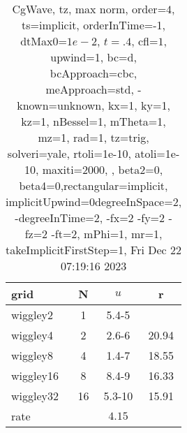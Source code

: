 \begin{table}[H]\tableFont %
\begin{center}
\begin{tabular}{|l|c|c|c|} \hline 
grid  & N &  $ u $ & r \\ \hline 
  wiggley2 &     1 & \num{5.4}{-5} &        \\ \hline
  wiggley4 &     2 & \num{2.6}{-6} & 20.94  \\ \hline
  wiggley8 &     4 & \num{1.4}{-7} & 18.55  \\ \hline
 wiggley16 &     8 & \num{8.4}{-9} & 16.33  \\ \hline
 wiggley32 &    16 & \num{5.3}{-10} & 15.91  \\ \hline
    rate             &       &  $4.15$       &       \\ \hline
\end{tabular}
\caption{CgWave, tz, max norm, order=$4$, ts=implicit, orderInTime=-1, dtMax0=$1e-2$, $t=.4$, cfl=$1$, upwind=1, bc=d, bcApproach=cbc, meApproach=std, -known=unknown, kx=1, ky=1, kz=1, nBessel=1, mTheta=1, mz=1, rad=1, tz=trig, solveri=yale, rtoli=1e-10, atoli=1e-10, maxiti=2000, , beta2=0, beta4=0,rectangular=implicit, implicitUpwind=0degreeInSpace=2, -degreeInTime=2, -fx=2 -fy=2 -fz=2 -ft=2, mPhi=1, mr=1, takeImplicitFirstStep=1, Fri Dec 22 07:19:16 2023}\label{table:tzOrder4max}
\end{center}
\end{table}

